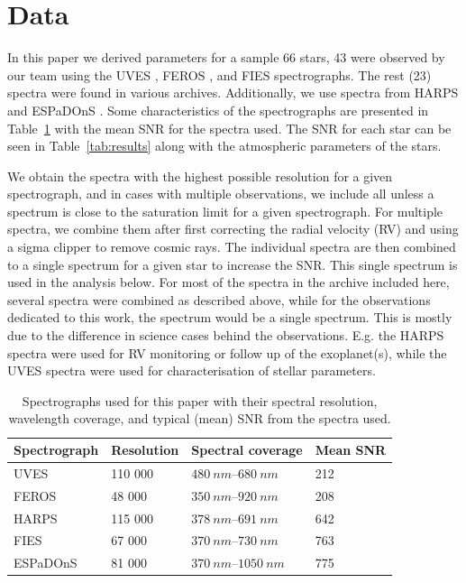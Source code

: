 \documentclass{aa}
\begin{document}
\section{Data}
\label{sec:data}
In this paper we derived parameters for a sample 66 stars,
43 were observed by our team using the UVES \citep{UVES}, FEROS
\citep{FEROS}, and FIES \citep{FIES} spectrographs. The rest (23) spectra were
found in various archives. Additionally, we use spectra from HARPS \citep{HARPS}
and ESPaDOnS \citep{ESPADONS}. Some characteristics of the spectrographs are
presented in Table~\ref{tab:instruments} with the mean SNR for the spectra used.
The SNR for each star can be seen in Table~\ref{tab:results} along with the
atmospheric parameters of the stars.

We obtain the spectra with the highest possible resolution for a given
spectrograph, and in cases with multiple observations, we include all unless a
spectrum is close to the saturation limit for a given spectrograph. For multiple
spectra, we combine them after first correcting the radial velocity (RV) and
using a sigma clipper to remove cosmic rays. The individual spectra are then
combined to a single spectrum for a given star to increase the SNR. This single
spectrum is used in the analysis below. For most of the spectra in the archive
included here, several spectra were combined as described above, while for the
observations dedicated to this work, the spectrum would be a single spectrum.
This is mostly due to the difference in science cases behind the observations.
E.g. the HARPS spectra were used for RV monitoring or follow up of the
exoplanet(s), while the UVES spectra were used for characterisation of stellar
parameters.

\begin{table}[htb!]
    \caption{Spectrographs used for this paper with their spectral resolution,
             wavelength coverage, and typical (mean) SNR from the spectra used.}
    \label{tab:instruments}
    \centering
    \begin{tabular}{llll}
      \hline\hline
      Spectrograph & Resolution & Spectral coverage           &   Mean SNR  \\
      \hline
      UVES         &    110 000 & $\SIrange{480}{680}{nm}$    &   212       \\
      FEROS        &     48 000 & $\SIrange{350}{920}{nm}$    &   208       \\
      HARPS        &    115 000 & $\SIrange{378}{691}{nm}$    &   642       \\
      FIES         &     67 000 & $\SIrange{370}{730}{nm}$    &   763       \\
      ESPaDOnS     &     81 000 & $\SIrange{370}{1050}{nm}$   &   775       \\
      \hline
    \end{tabular}
\end{table}
\end{document}
